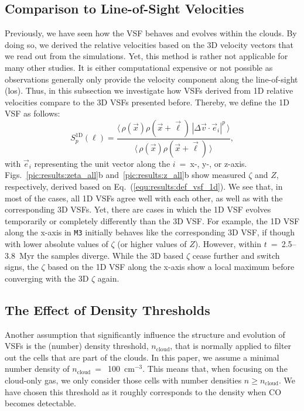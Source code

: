 \subsection{Comparison to Line-of-Sight Velocities}\label{results:1d}

Previously, we have seen how the VSF behaves and evolves within the clouds.
By doing so, we derived the relative velocities based on the 3D velocity vectors that we read out from the simulations.
Yet, this method is rather not applicable for many other studies. 
It is either computational expensive or not possible as observations generally only provide the velocity component along the line-of-sight (los).
Thus, in this subsection we investigate how VSFs derived from 1D relative velocities compare to the 3D VSFs presented before.
Thereby, we define the 1D VSF as follows:
\begin{equation}
	\mathit{S}_p^\mathrm{1D} (\ell) = \frac{\langle \, \rho(\vec{x}) \rho(\vec{x}+\vec{\ell}) \, |\Delta \vec{v} \cdot \vec{e}_i|^p  \, \rangle}{\langle  \, \rho(\vec{x}) \rho(\vec{x}+\vec{\ell}) \, \rangle} ,
    \label{equ:results:def_vsf_1d}
\end{equation}
with $\vec{e}_i$ representing the unit vector along the $i$~=~x-, y-, or z-axis.
Figs.~\ref{pic:results:zeta_all}b and~\ref{pic:results:z_all}b show measured $\zeta$ and $Z$, respectively, derived based on Eq.~(\ref{equ:results:def_vsf_1d}). 
We see that, in most of the cases, all 1D VSFs agree well with each other, as well as with the corresponding 3D VSFs.
Yet, there are cases in which the 1D VSF evolves temporarily or completely differently than the 3D VSF.
For example, the 1D VSF along the x-axis in \texttt{M3} initially behaves like the corresponding 3D VSF, if though with lower absolute values of $\zeta$ (or higher values of $Z$).
However, within $t$~=~2.5--3.8~Myr the samples diverge. 
While the 3D based $\zeta$ cease further and switch signs, the $\zeta$ based on the 1D VSF along the x-axis show a local maximum before converging with the 3D $\zeta$ again. 



\subsection{The Effect of Density Thresholds}\label{results:densthres}

Another assumption that significantly influence the structure and evolution of VSFs is the (number) density threshold, $n_\mathrm{cloud}$, that is normally applied to filter out the cells that are part of the clouds.
In this paper, we assume a minimal number density of $n_\mathrm{cloud}~=$~100~cm$^{-3}$.
This means that, when focusing on the cloud-only gas, we only consider those cells with number densities $n \geq n_\mathrm{cloud}$.
We have chosen this threshold as it roughly corresponds to the density when CO becomes detectable.

